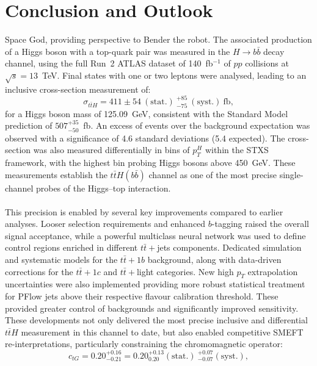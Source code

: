 \chapter{Conclusion and Outlook}
\label{app:conclusion}
%
{Space God, providing perspective to Bender the robot.}
The associated production of a Higgs boson with a top-quark pair was measured in the $H \to b\bar{b}$ decay channel, using the full Run~2 ATLAS dataset of 140~fb$^{-1}$ of $pp$ collisions at $\sqrt{s} = 13$~TeV. Final states with one or two leptons were analysed, leading to an inclusive cross-section measurement of:
\begin{equation*}
   \sigma_{t\bar{t}H} = 411 \pm 54~(\text{stat.})~^{+85}_{-75}~(\text{syst.})~\text{fb},
\end{equation*}
for a Higgs boson mass of 125.09~GeV, consistent with the Standard Model prediction of $507^{+35}_{-50}$~fb. An excess of events over the background expectation was observed with a significance of 4.6 standard deviations (5.4 expected). The cross-section was also measured differentially in bins of $p_{T}^H$ within the STXS framework, with the highest bin probing Higgs bosons above 450~GeV. These measurements establish the $t\bar{t}H(b\bar{b})$ channel as one of the most precise single-channel probes of the Higgs–top interaction.\\
\\
This precision is enabled by several key improvements compared to earlier analyses. Looser selection requirements and enhanced $b$-tagging raised the overall signal acceptance, while a powerful multiclass neural network was used to define control regions enriched in different $t\bar{t}+$jets components. Dedicated simulation and systematic models for the $t\bar{t}+1b$ background, along with data-driven corrections for the $t\bar{t}+1c$ and $t\bar{t}+$light categories. New high $p_T$ extrapolation uncertainties were also implemented providing more robust statistical treatment for PFlow jets above their respective flavour calibration threshold. These provided greater control of backgrounds and significantly improved sensitivity. These developments not only delivered the most precise inclusive and differential $t\bar{t}H$ measurement in this channel to date, but also enabled competitive SMEFT re-interpretations, particularly constraining the chromomagnetic operator: 
\begin{equation*}
    c_{tG} = 0.20^{+0.16}_{-0.21}=0.20^{+0.13}_{0.20} (\text{stat.})~^{+0.07}_{-0.07} (\text{syst.}), 
\end{equation*} 
